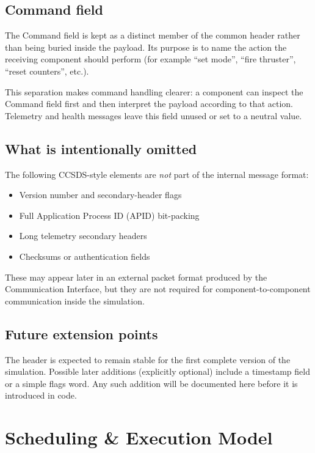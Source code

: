 \documentclass[11pt,a4paper]{article}
\begin{document}
\subsection{Command field}

The Command field is kept as a distinct member of the common header rather than being buried inside the payload. Its purpose is to name the action the receiving component should perform (for example ``set mode'', ``fire thruster'', ``reset counters'', etc.).

This separation makes command handling clearer: a component can inspect the Command field first and then interpret the payload according to that action. Telemetry and health messages leave this field unused or set to a neutral value.

\subsection{What is intentionally omitted}

The following CCSDS-style elements are \emph{not} part of the internal message format:

\begin{itemize}
    \item Version number and secondary-header flags
    \item Full Application Process ID (APID) bit-packing
    \item Long telemetry secondary headers
    \item Checksums or authentication fields
\end{itemize}

These may appear later in an external packet format produced by the Communication Interface, but they are not required for component-to-component communication inside the simulation.

\subsection{Future extension points}

The header is expected to remain stable for the first complete version of the simulation. Possible later additions (explicitly optional) include a timestamp field or a simple flags word. Any such addition will be documented here before it is introduced in code.

\section{Scheduling \& Execution Model}
\end{document}
